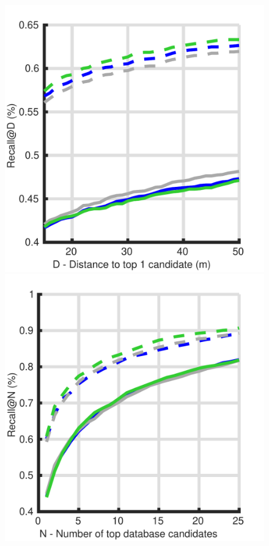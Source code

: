 \begin{figure}
	\center
	\begin{minipage}{0.27\linewidth}
		\center \scriptsize
		\includegraphics[width=\linewidth]{plot/depth_vs_ref/Results_cmu_lt/distance}	
		
		\includegraphics[width=\linewidth]{plot/depth_vs_ref/Results_cmu_lt/recall}
		

\end{minipage}
\end{figure}
